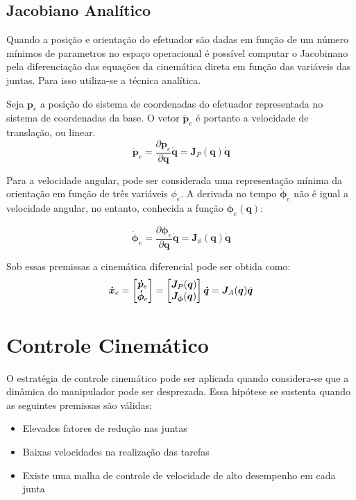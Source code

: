 \subsection{Jacobiano Analítico}
Quando a posição e orientação do efetuador são dadas em função de um número mínimos de parametros no espaço operacional é possível computar o Jacobinano pela diferenciação das equações da cinemática direta em função das variáveis das juntas.
Para isso utiliza-se a técnica analítica.

Seja $\bm{p}_e$ a posição do sistema de coordenadas do efetuador representada no sistema de coordenadas da base. O vetor $\dot{\bm{p}}_e$ é portanto a velocidade de translação, ou linear.
\begin{equation} \label{eq:jacob_pos}
\dot{\bm{p}}_e = \frac{\partial \bm{p}_e }{\partial \bm{q}} \dot{\bm{q}} = \bm{J}_P (\bm{q}) \dot{\bm{q}} 
\end{equation}

Para a velocidade angular, pode ser considerada uma representação mínima da orientação em função de três variáveis $\phi_e$. 
A derivada no tempo $\dot{\bm{\phi}}_e$ não é igual a velocidade angular, no entanto, conhecida a função $\bm{\phi}_e(\bm{q})$:

\begin{equation} \label{eq:jacob_or}
\dot{\bm{\phi}}_e = \frac{\partial \bm{\phi}_e}{\partial \bm{q}} \bm{\dot{q}} = \bm{J}_{\phi}(\bm{q})\bm{\dot{q}}
\end{equation}

Sob essas premissas a cinemática diferencial pode ser obtida como:
\begin{equation} \label{eq:jacoba}
\bm{\dot{x}}_e = \begin{bmatrix}\bm{\dot{p}}_e \\ \bm{\dot{\phi}}_e\end{bmatrix} = \begin{bmatrix}\bm{J}_P(\bm{q}) \\ \bm{J_\phi}(\bm{q})\end{bmatrix} \bm{\dot{q}} = \bm{J}_A (\bm{q}) \dot{\bm{q}}
\end{equation}

 
\section{Controle Cinemático}
\label{sec:controle_cinematico}
O estratégia de controle cinemático pode ser aplicada quando considera-se que a dinâmica do manipulador pode ser desprezada. Essa hipótese se sustenta quando as seguintes premissas são válidas:
\begin{itemize}
\item Elevados fatores de redução nas juntas
\item Baixas velocidades na realização das tarefas
\item Existe uma malha de controle de velocidade de alto desempenho em cada junta
\end{itemize}

